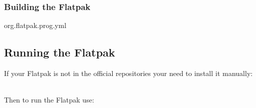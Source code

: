 \subsubsection{Building the Flatpak}

{\footnotesize{
\begin{script}
org.flatpak.prog.yml
   
\end{script}
}}

\subsection{Running the Flatpak}

If your Flatpak is not in the official repositories your need to install it manually:
{\scriptsize{
\begin{script}
     
\end{script}
}}
\\[-0.25cm]
\noindent Then to run the Flatpak use:
{\scriptsize{
\begin{script}
    
\end{script}
}}

